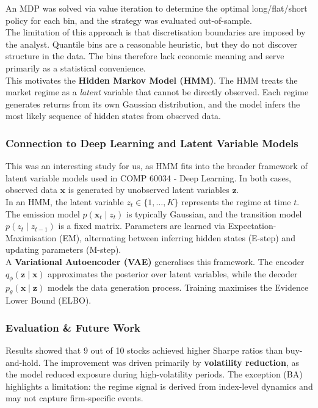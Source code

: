 \documentclass{article}
\begin{document}
An MDP was solved via value iteration to determine the optimal long/flat/short policy for each bin, and the strategy was evaluated out-of-sample.\\

The limitation of this approach is that discretisation boundaries are imposed by the analyst. Quantile bins are a reasonable heuristic, but they do not discover structure in the data. The bins therefore lack economic meaning and serve primarily as a statistical convenience.\\

This motivates the \textbf{Hidden Markov Model (HMM)}. The HMM treats the market regime as a \emph{latent} variable that cannot be directly observed. Each regime generates returns from its own Gaussian distribution, and the model infers the most likely sequence of hidden states from observed data.\\

\subsubsection{Connection to Deep Learning and Latent Variable Models}

This was an interesting study for us, as HMM fits into the broader framework of latent variable models used in COMP 60034 - Deep Learning. In both cases, observed data $\mathbf{x}$ is generated by unobserved latent variables $\mathbf{z}$.\\

In an HMM, the latent variable $z_t \in \{1, \dots, K\}$ represents the regime at time $t$. The emission model $p(\mathbf{x}_t \mid z_t)$ is typically Gaussian, and the transition model $p(z_t \mid z_{t-1})$ is a fixed matrix. Parameters are learned via Expectation-Maximisation (EM), alternating between inferring hidden states (E-step) and updating parameters (M-step).\\

A \textbf{Variational Autoencoder (VAE)} generalises this framework. The encoder $q_\phi(\mathbf{z} \mid \mathbf{x})$ approximates the posterior over latent variables, while the decoder $p_\theta(\mathbf{x} \mid \mathbf{z})$ models the data generation process. Training maximises the Evidence Lower Bound (ELBO).


\subsubsection{Evaluation \& Future Work}
Results showed that 9 out of 10 stocks achieved higher Sharpe ratios than buy-and-hold. The improvement was driven primarily by \textbf{volatility reduction}, as the model reduced exposure during high-volatility periods. The exception (BA) highlights a limitation: the regime signal is derived from index-level dynamics and may not capture firm-specific events.\\
\end{document}

